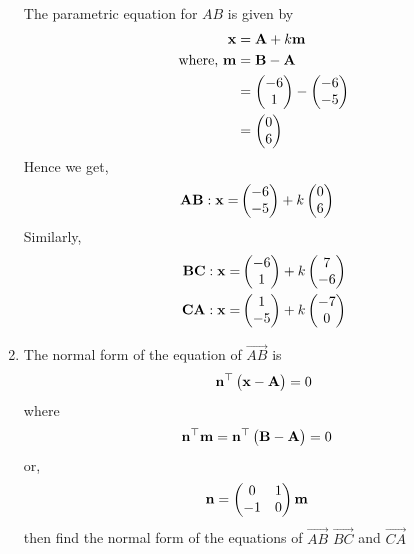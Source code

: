 \documentclass[11pt]{book}
\begin{document}
\begin{enumerate}[label=\thesection.\arabic*.,ref=\thesection.\theenumi]
	\solution\\
	The parametric equation for $AB$ is given by
	\begin{align}
		\mathbf{x} &= \mathbf{A} + k\mathbf{m}\\
		\text{where, } \mathbf{m} &= \mathbf{B} -\mathbf{A}\\
		&= \begin{pmatrix}-6 \\ 1\end{pmatrix} -\begin{pmatrix}-6 \\ -5\end{pmatrix}\\
		&= \begin{pmatrix}0 \\ 6\end{pmatrix}
	\end{align}
	Hence we get,
	\begin{align}
		\mathbf{AB}: \mathbf{x} = &\begin{pmatrix}-6\\-5\end{pmatrix} + k \begin{pmatrix}0\\6\end{pmatrix}
	\end{align}
	Similarly, 
	\begin{align}
		\mathbf{BC}: \mathbf{x} = &\begin{pmatrix}-6\\1\end{pmatrix} + k \begin{pmatrix}7\\-6\end{pmatrix}\\
		\mathbf{CA}: \mathbf{x} = &\begin{pmatrix}1\\-5\end{pmatrix} + k \begin{pmatrix}-7\\0\end{pmatrix}
	\end{align}

\item The normal form of the equation of $\vec{AB}$ is
\begin{align}
\mathbf{n}^{\top}\begin{pmatrix}\mathbf{x}-\mathbf{A}\end{pmatrix}=0
\end{align}
where
\begin{align}
\mathbf{n}^{\top}\mathbf{m}&=\mathbf{n}^{\top}\begin{pmatrix}\mathbf{B}-\mathbf{A}\end{pmatrix}=0
\end{align} 
or,\begin{align}
\mathbf{n}&=\begin{pmatrix}0 &1 \\-1 & 0\end{pmatrix}\mathbf{m}
\end{align}
then find the normal form of the equations of $\vec{AB}$ $\vec{BC}$ and $\vec{CA}$


\end{enumerate}
\end{document}
